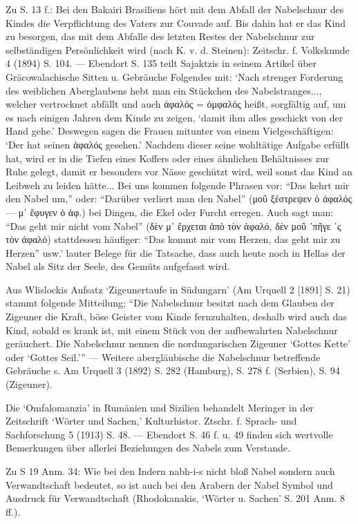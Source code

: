 \documentclass[a4paper, 11pt, oneside]{article}
\begin{document}
Zu S. 13 f.: Bei den Bakairi Brasiliens hört mit dem Abfall der Nabelschnur des Kindes die Verpflichtung des Vaters zur Couvade auf. Bis dahin hat er das Kind zu besorgen, das mit dem Abfalle des letzten Restes der Nabelschnur zur selbständigen Persönlichkeit wird (nach K. v. d. Steinen): Zeitschr. f. Volkskunde 4 (1894) S. 104. --- Ebendort S. 135 teilt Sajaktzis in seinem Artikel über Gräcowalachische Sitten u. Gebräuche Folgendes mit: `Nach strenger Forderung des weiblichen Aberglaubens hebt man ein Stückchen des Nabelstranges..., welcher vertrocknet abfällt und auch ἀφαλός = ὀμφαλός heißt, sorgfältig auf, um es nach einigen Jahren dem Kinde zu zeigen, `damit ihm alles geschickt von der Hand gehe.' Deswegen sagen die Frauen mitunter von einem Vielgeschäftigen: `Der hat seinen ἀφαλός gesehen.' Nachdem dieser seine wohltätige Aufgabe erfüllt hat, wird er in die Tiefen eines Koffers oder eines ähnlichen Behältnisses zur Ruhe gelegt, damit er besonders vor Nässe geschützt wird, weil sonst das Kind an Leibweh zu leiden hätte... Bei uns kommen folgende Phrasen vor: "`Das kehrt mir den Nabel um,"' oder: "`Darüber verliert man den Nabel"' (μοῦ ξέστρεψεν ὁ ἀφαλός --- μ᾽ ἔφυγεν ὁ ἀφ.) bei Dingen, die Ekel oder Furcht erregen. Auch sagt man: "`Das geht mir nicht vom Nabel"' (δὲν μ᾽ ἔρχεται ἀπὸ τὸν ἀφαλό, δὲν μοῦ ᾽πῆγε ᾽ς τὸν ἀφαλό) stattdessen häufiger: "`Das kommt mir vom Herzen, das geht mir zu Herzen"' usw.' lauter Belege für die Tatsache, dass auch heute noch in Hellas der Nabel als Sitz der Seele, des Gemüts aufgefasst wird.

Aus Wlislockis Aufsatz `Zigeunertaufe in Südungarn' (Am Urquell 2 [1891] S. 21) stammt folgende Mitteilung; "`Die Nabelschnur besitzt nach dem Glauben der Zigeuner die Kraft, böse Geister vom Kinde fernzuhalten, deshalb wird auch das Kind, sobald es krank ist, mit einem Stück von der aufbewahrten Nabelschnur geräuchert. Die Nabelschnur nennen die nordungarischen Zigeuner `Gottes Kette' oder `Gottes Seil.'"' --- Weitere abergläubische die Nabelschnur betreffende Gebräuche s. Am Urquell 3 (1892) S. 282 (Hamburg), S. 278 f. (Serbien), S. 94 (Zigeuner).

Die `Omfalomanzia' in Rumänien und Sizilien behandelt Meringer in der Zeitschrift `Wörter und Sachen,' Kulturhistor. Ztschr. f. Sprach- und Sachforschung 5 (1913) S. 48. --- Ebendort S. 46 f. u. 49 finden sich wertvolle Bemerkungen über allerlei Beziehungen des Nabels zum Verstande.

Zu S 19 Anm. 34: Wie bei den Indern nabh-i-s nicht bloß Nabel sondern auch Verwandtschaft bedeutet, so ist auch bei den Arabern der Nabel Symbol und Ausdruck für Verwandtschaft (Rhodokanakis, `Wörter u. Sachen' S. 201 Anm. 8 ff.).
\end{document}
